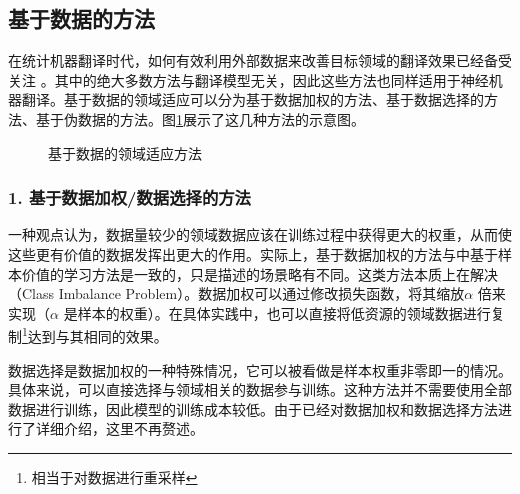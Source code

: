 \subsection{基于数据的方法}
\label{sec:domain-adaptatoin-data-based-method}

\parinterval 在统计机器翻译时代，如何有效利用外部数据来改善目标领域的翻译效果已经备受关注
。其中的绝大多数方法与翻译模型无关，因此这些方法也同样适用于神经机器翻译。基于数据的领域适应可以分为基于数据加权的方法、基于数据选择的方法、基于伪数据的方法。图\ref{fig:16-20}展示了这几种方法的示意图。

\begin{figure}[h]
\centering

\caption{基于数据的领域适应方法}
\label{fig:16-20}
\end{figure}

\subsubsection{1. 基于数据加权/数据选择的方法}

\parinterval 一种观点认为，数据量较少的领域数据应该在训练过程中获得更大的权重，从而使这些更有价值的数据发挥出更大的作用。实际上，基于数据加权的方法与{\chapterthirteen}中基于样本价值的学习方法是一致的，只是描述的场景略有不同。这类方法本质上在解决{\small{}}（Class Imbalance Problem）。数据加权可以通过修改损失函数，将其缩放$\alpha$ 倍来实现（$\alpha$  是样本的权重）。在具体实践中，也可以直接将低资源的领域数据进行复制\footnote{相当于对数据进行重采样}达到与其相同的效果。

\parinterval 数据选择是数据加权的一种特殊情况，它可以被看做是样本权重非零即一的情况。具体来说，可以直接选择与领域相关的数据参与训练。这种方法并不需要使用全部数据进行训练，因此模型的训练成本较低。由于{\chapterthirteen}已经对数据加权和数据选择方法进行了详细介绍，这里不再赘述。

